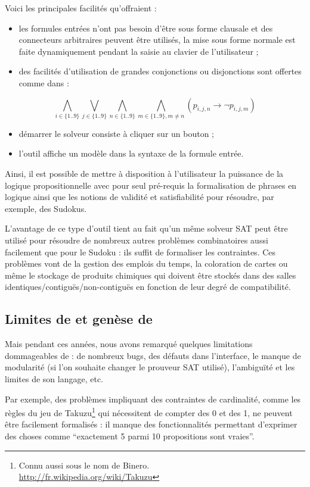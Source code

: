 Voici les principales facilités qu'offraient \satoulouse :
\begin{itemize}
\item les formules entrées n'ont pas besoin d'être sous forme clausale et des connecteurs arbitraires peuvent être utilisés, la mise sous forme normale est faite dynamiquement pendant la saisie au clavier de l'utilisateur ;
\item des facilités d'utilisation de grandes conjonctions ou disjonctions sont offertes comme dans :
\end{itemize}
  \[\bigwedge_{i\in\{1..9\}}
  \bigvee_{j\in\{1..9\}}\bigwedge_{n\in\{1..9\}}\bigwedge_{m\in\{1..9\},m\neq
    n}(p_{i,j,n}\rightarrow \lnot p_{i,j,m})\]
\begin{itemize}
\item démarrer le solveur consiste à cliquer sur un bouton ;
\item l'outil affiche un modèle dans la syntaxe de la formule entrée.
\end{itemize}
Ainsi, il est possible de mettre à disposition à l'utilisateur la puissance de la logique propositionnelle avec pour seul pré-requis la formalisation de phrases en logique ainsi que les notions de validité et satisfiabilité pour résoudre, par exemple, des Sudokus.\

L'avantage de ce type d'outil tient au fait qu'un même solveur SAT peut être utilisé pour résoudre de nombreux autres problèmes combinatoires aussi facilement que pour le Sudoku : ils suffit de formaliser les contraintes. Ces problèmes vont de la gestion des emplois du temps, la coloration de cartes ou même le stockage de produits chimiques qui doivent être stockés dans des salles identiques/contiguës/non-contiguës en fonction de leur degré de compatibilité.

\subsection{Limites de \satoulouse et genèse de \touist}
Mais pendant ces années, nous avons remarqué quelques limitations dommageables de \satoulouse : de nombreux bugs, des défauts dans l'interface, le manque de modularité (si l'on souhaite changer le prouveur SAT utilisé), l'ambiguïté et les limites de son langage, etc.

Par exemple, des problèmes impliquant des contraintes de cardinalité, comme les règles du jeu de Takuzu\footnote{Connu aussi sous le nom de Binero.\\ \url{http://fr.wikipedia.org/wiki/Takuzu}} qui nécessitent de compter des 0 et des 1, ne peuvent être facilement formalisés : il manque des fonctionnalités permettant d'exprimer des choses comme ``exactement 5 parmi 10 propositions sont vraies''. 

